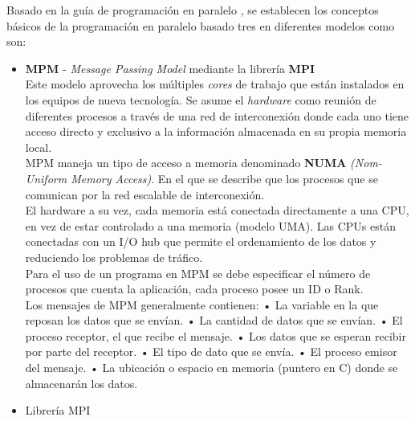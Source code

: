 Basado en la guía de programación en paralelo \cite{acosta2012guia}, se establecen los conceptos básicos de la programación en paralelo basado tres en diferentes modelos como son:

\begin{itemize}
	\item \textbf{MPM} - \textit{Message Passing Model} mediante la librería \textbf{MPI}
	\\
	Este modelo aprovecha los múltiples \textit{cores} de trabajo que están instalados en los equipos de nueva tecnología. Se asume el \textit{hardware} como reunión de diferentes procesos a través de una red de interconexión donde cada uno tiene acceso directo y exclusivo a la información almacenada en su propia memoria local.\\
	
	MPM maneja un tipo de acceso a memoria denominado \textbf{NUMA} \textit{(Nom-Uniform Memory Access)}. En el que se describe que los procesos que se comunican por la red escalable de interconexión.\\
	El hardware a su vez, cada memoria está conectada directamente a una CPU, en vez de estar controlado a una memoria (modelo UMA). Las CPUs están conectadas con un I/O hub que permite el ordenamiento de los datos y reduciendo los problemas de tráfico.\\
	Para el uso de un programa en MPM se debe especificar el número de procesos que cuenta la aplicación, cada proceso posee un ID o Rank.\\

	Los mensajes de MPM generalmente contienen:
		\subitem •	 La variable en la que reposan los datos que se envían.
		\subitem •	 La cantidad de datos que se envían.
		\subitem •	 El proceso receptor, el que recibe el mensaje.
		\subitem •	 Los datos que se esperan recibir por parte del receptor.
		\subitem •	 El tipo de dato que se envía.
		\subitem •	 El proceso emisor del mensaje.
		\subitem •	 La ubicación o espacio en memoria (puntero en C) donde se almacenarán los datos.\\
       
	\item Librería MPI


\end{itemize}
